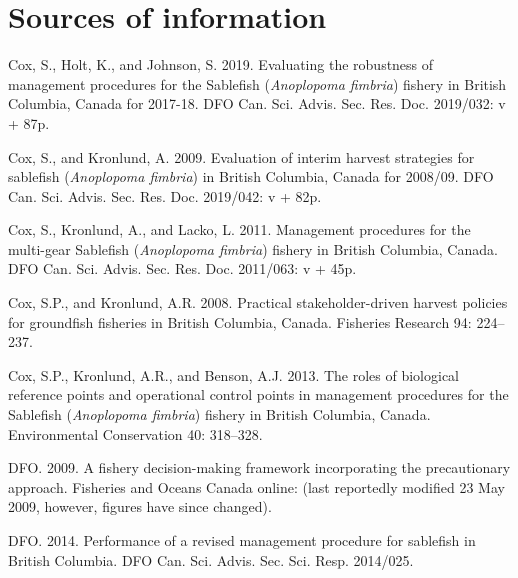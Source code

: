 \documentclass[11pt]{book}
\begin{document}
\hypertarget{sources-of-information}{%
\section{Sources of information}\label{sources-of-information}}

\noindent
\vspace{-2em}
\setlength{\parindent}{-0.2in}
\setlength{\leftskip}{0.2in}
\setlength{\parskip}{8pt}

\hypertarget{refs}{}
\leavevmode\hypertarget{ref-cox2019evaluating}{}%
Cox, S., Holt, K., and Johnson, S. 2019. Evaluating the robustness of management procedures for the Sablefish (\emph{Anoplopoma fimbria}) fishery in British Columbia, Canada for 2017-18. DFO Can. Sci. Advis. Sec. Res. Doc. 2019/032: v + 87p.

\leavevmode\hypertarget{ref-cox2009evaluation}{}%
Cox, S., and Kronlund, A. 2009. Evaluation of interim harvest strategies for sablefish (\emph{Anoplopoma fimbria}) in British Columbia, Canada for 2008/09. DFO Can. Sci. Advis. Sec. Res. Doc. 2019/042: v + 82p.

\leavevmode\hypertarget{ref-cox2011management}{}%
Cox, S., Kronlund, A., and Lacko, L. 2011. Management procedures for the multi-gear Sablefish (\emph{Anoplopoma fimbria}) fishery in British Columbia, Canada. DFO Can. Sci. Advis. Sec. Res. Doc. 2011/063: v + 45p.

\leavevmode\hypertarget{ref-cox2008practical}{}%
Cox, S.P., and Kronlund, A.R. 2008. Practical stakeholder-driven harvest policies for groundfish fisheries in British Columbia, Canada. Fisheries Research 94: 224--237.

\leavevmode\hypertarget{ref-cox2013roles}{}%
Cox, S.P., Kronlund, A.R., and Benson, A.J. 2013. The roles of biological reference points and operational control points in management procedures for the Sablefish (\emph{Anoplopoma fimbria}) fishery in British Columbia, Canada. Environmental Conservation 40: 318--328.

\leavevmode\hypertarget{ref-DFO2009}{}%
DFO. 2009. A fishery decision-making framework incorporating the precautionary approach. Fisheries and Oceans Canada online: (last reportedly modified 23 May 2009, however, figures have since changed).

\leavevmode\hypertarget{ref-dfo2014performanc}{}%
DFO. 2014. Performance of a revised management procedure for sablefish in British Columbia. DFO Can. Sci. Advis. Sec. Sci. Resp. 2014/025.
\end{document}
